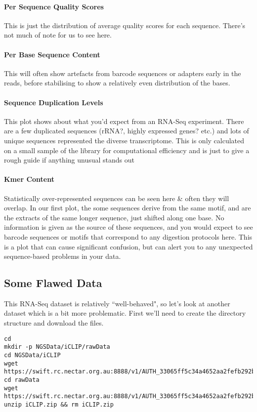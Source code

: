 \paragraph*{Per Sequence Quality Scores}
This is just the distribution of average quality scores for each sequence.
There's not much of note for us to see here.

\paragraph{Per Base Sequence Content}
This will often show artefacts from barcode sequences or adapters early in the reads, before stabilising to show a relatively even distribution of the bases.

\paragraph{Sequence Duplication Levels}
This plot shows about what you'd expect from an RNA-Seq experiment.
There are a few duplicated sequences (rRNA?, highly expressed genes? etc.) and lots of unique sequences represented the diverse transcriptome.
This is only calculated on a small sample of the library for computational efficiency and is just to give a rough guide if anything unusual stands out

\paragraph{Kmer Content}
Statistically over-represented sequences can be seen here \& often they will overlap. 
In our first plot, the some sequences derive from the same motif, and are the extracts of the same longer sequence, just shifted along one base.
No information is given as the source of these sequences, and you would expect to see barcode sequences or motifs that correspond to any digestion protocols here.
This is a plot that can cause significant confusion, but can alert you to any unexpected sequence-based problems in your data.

\subsection{Some Flawed Data}
This RNA-Seq dataset is relatively ``well-behaved", so let's look at another dataset which is a bit more problematic.
First we'll need to create the directory structure and download the files.

\begin{lstlisting}
cd
mkdir -p NGSData/iCLIP/rawData
cd NGSData/iCLIP
wget https://swift.rc.nectar.org.au:8888/v1/AUTH_33065ff5c34a4652aa2fefb292b3195a/IntroNGS_2015/iCLIP_adapters.txt
cd rawData
wget https://swift.rc.nectar.org.au:8888/v1/AUTH_33065ff5c34a4652aa2fefb292b3195a/IntroNGS_2015/iCLIP.zip
unzip iCLIP.zip && rm iCLIP.zip
\end{lstlisting}

